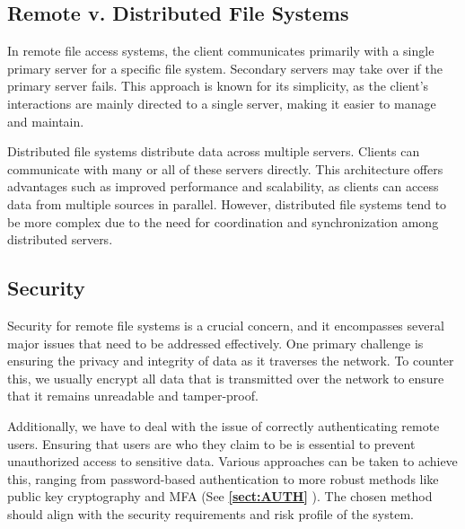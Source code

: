 \documentclass{report}
\newcommand{\refto}[2]{\textbf{\ref{#1:#2} \nameref{#1:#2}}}
\begin{document}
\subsection{Remote v. Distributed File Systems}
\begin{tcbraster}[raster columns=2, raster equal height, raster force size=false]
  \begin{tcolorbox}[colback=teal!5!white,colframe=black!75!teal,title=Remote]
    In remote file access systems, the client communicates primarily with a single primary server
    for a specific file system. Secondary servers may take over if the primary server fails. This
    approach is known for its simplicity, as the client's interactions are mainly directed to a
    single server, making it easier to manage and maintain. 
  \end{tcolorbox}
  \begin{tcolorbox}[colback=yellow!5!white,colframe=black!75!yellow,title=Distributed]
    Distributed file systems distribute data across multiple servers. Clients
    can communicate with many or all of these servers directly. This architecture offers advantages
    such as improved performance and scalability, as clients can access data from multiple sources
    in parallel. However, distributed file systems tend to be more complex due to the need for
    coordination and synchronization among distributed servers. 
  \end{tcolorbox}
\end{tcbraster}

\subsection{Security}
Security for remote file systems is a crucial concern, and it encompasses several major issues that
need to be addressed effectively. One primary challenge is ensuring the privacy and integrity of
data as it traverses the network. To counter this, we usually encrypt all data that is
transmitted over the network to ensure that it remains unreadable and tamper-proof.

Additionally, we have to deal with the issue of correctly authenticating remote users. Ensuring that
users are who they claim to be is essential to prevent unauthorized access to sensitive
data. Various approaches can be taken to achieve this, ranging from password-based authentication to
more robust methods like public key cryptography and MFA (See \refto{sect}{AUTH}). The chosen method
should align with the security requirements and risk profile of the system.
\end{document}
